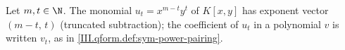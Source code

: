 Let $m,t\in\N$. The monomial $u_t=x^{m-t}y^t$ of $K[x,y]$ has exponent vector $(m-t,\,t)$ (truncated subtraction); the coefficient of $u_t$ in a polynomial $v$ is written $v_t$,
as in \cref{III.qform.def:sym-power-pairing}.
